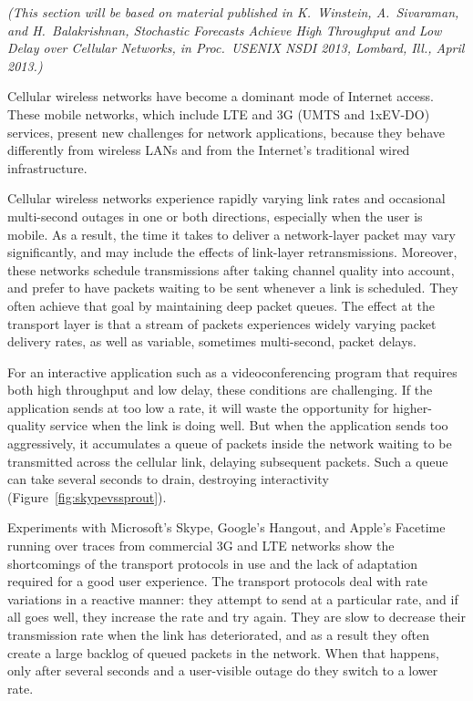 \documentclass{article}
\begin{document}
\emph{(This section will be based on material published in
  K.~Winstein, A.~Sivaraman, and H.~Balakrishnan, Stochastic Forecasts
  Achieve High Throughput and Low Delay over Cellular Networks, in
  Proc.~USENIX NSDI 2013, Lombard, Ill., April 2013.)}

\vspace{\baselineskip}

Cellular wireless networks have become a dominant mode of Internet
access. These mobile networks, which include LTE and 3G (UMTS and
1xEV-DO) services, present new challenges for network applications,
because they behave differently from wireless LANs and from the
Internet's traditional wired infrastructure.

Cellular wireless networks experience rapidly varying link rates
and occasional multi-second outages in one or both directions,
especially when the user is mobile. As a result, the time it takes to
deliver a network-layer packet may vary significantly, and may include
the effects of link-layer retransmissions. Moreover, these networks
schedule transmissions after taking channel quality into account, and
prefer to have packets waiting to be sent whenever a link is
scheduled. They often achieve that goal by maintaining deep packet
queues. The effect at the transport layer is that a stream of packets
experiences widely varying packet delivery rates, as well as variable,
sometimes multi-second, packet delays.

For an interactive application such as a videoconferencing program
that requires both high throughput and low delay, these conditions are
challenging. If the application sends at too low a rate, it will waste
the opportunity for higher-quality service when the link is
doing well. But when the application sends too aggressively, it
accumulates a queue of packets inside the network waiting to be
transmitted across the cellular link, delaying subsequent
packets. Such a queue can take several seconds to drain, destroying
interactivity (Figure~\ref{fig:skypevssprout}).

Experiments with Microsoft's Skype, Google's Hangout, and Apple's
Facetime running over traces from commercial 3G and LTE networks show
the shortcomings of the transport protocols in use and the lack of
adaptation required for a good user experience.
The transport protocols deal with rate variations in a reactive
manner: they attempt to send at a particular rate, and if all goes
well, they increase the rate and try again. They are slow to
decrease their transmission rate when the link has deteriorated, and as a
result they often create a large backlog of queued packets in the
network. When that happens, only after several seconds and a
user-visible outage do they switch to a lower rate.
\end{document}
